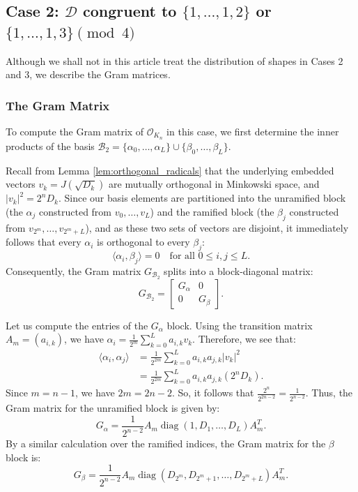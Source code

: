 \documentclass{amsart}
\theoremstyle{plain}
\theoremstyle{definition}
\theoremstyle{remark}
\numberwithin{equation}{section}
\begin{document}
\subsection{Case 2: \texorpdfstring{$\mathcal{D}$ congruent to $\{1, \ldots, 1, 2\}$ or $\{1, \ldots, 1, 3\} \pmod 4$}{Case 2}}
Although we shall not in this article treat the distribution of shapes in Cases 2 and 3, we describe the Gram matrices.
\subsubsection*{The Gram Matrix}

To compute the Gram matrix of $\mathcal{O}_{K_n}$ in this case, we first determine the inner products of the basis $\mathcal{B}_2 = \{\alpha_0, \ldots, \alpha_L\} \cup \{\beta_0, \ldots, \beta_L\}$. 

Recall from Lemma \ref{lem:orthogonal_radicals} that the underlying embedded vectors $v_k = J(\sqrt{D_k})$ are mutually orthogonal in Minkowski space, and $|v_k|^2 = 2^n D_k$. Since our basis elements are partitioned into the unramified block (the $\alpha_j$ constructed from $v_0, \ldots, v_L$) and the ramified block (the $\beta_j$ constructed from $v_{2^m}, \ldots, v_{2^m+L}$), and as these two sets of vectors are disjoint, it immediately follows that every $\alpha_i$ is  orthogonal to every $\beta_j$:
\[
    \langle \alpha_i, \beta_j \rangle = 0 \quad \text{for all } 0 \leq i, j \leq L.
\]
Consequently, the Gram matrix $G_{\mathcal{B}_2}$  splits into a block-diagonal matrix:
\[
    G_{\mathcal{B}_2} = \begin{bmatrix} G_\alpha & 0 \\ 0 & G_\beta \end{bmatrix}.
\]

Let us compute the entries of the $G_\alpha$ block. Using the transition matrix $A_m = (a_{i,k})$, we have $\alpha_i = \frac{1}{2^m} \sum_{k=0}^L a_{i,k} v_k$. Therefore, we see that:
\begin{align*}
    \langle \alpha_i, \alpha_j \rangle &= \frac{1}{2^{2m}} \sum_{k=0}^L a_{i,k} a_{j,k} |v_k|^2 \\
    &= \frac{1}{2^{2m}} \sum_{k=0}^L a_{i,k} a_{j,k} (2^n D_k).
\end{align*}
Since $m = n - 1$, we have $2m = 2n - 2$. So, it follows that $\frac{2^n}{2^{2n-2}} = \frac{1}{2^{n-2}}$. Thus, the Gram matrix for the unramified block is given by:
\[
    G_\alpha = \frac{1}{2^{n-2}} A_m \operatorname{diag}(1, D_1, \ldots, D_L) A_m^T.
\]
By a similar calculation over the ramified indices, the Gram matrix for the $\beta$ block is:
\[
    G_\beta = \frac{1}{2^{n-2}} A_m \operatorname{diag}(D_{2^m}, D_{2^m+1}, \ldots, D_{2^m+L}) A_m^T.
\]
\end{document}
